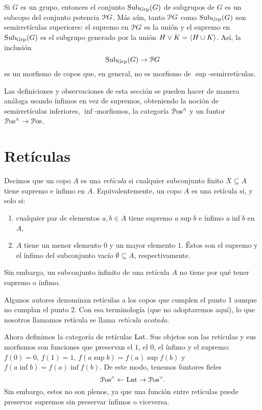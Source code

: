 \begin{example}
  Si $G$ es un grupo, entonces el conjunto $\Sub_\Grp(G)$ de subgrupos
  de $G$ es un subcopo del conjunto potencia $\cal PG$.
  Más aún, tanto $\cal PG$ como $\Sub_\Grp(G)$ son semirretículas
  superiores: el supremo en $\cal PG$ es la unión y el supremo en
  $\Sub_\Grp(G)$ es el subgrupo generado por la unión $H\sup K=\<H\cup
  K\>$. Así, la inclusión
  \begin{equation}
    \Sub_\Grp(G) \to \cal PG
  \end{equation}
  es un morfismo de copos que, en general, no es morfismo de
  $\sup$-semirretículas.
\end{example}

Las definiciones y observaciones de esta sección se pueden hacer
de manera análoga usando ínfimos en vez de supremos, obteniendo
la noción de semirretículas inferiores, $\inf$-morfismos, la
categoría $\Pos^{\inf}$ y un funtor $\Pos^{\inf}\to\Pos$.

\section{Retículas}\label{ret}

Decimos que un copo $A$ es una \emph{ retícula } si cualquier
subconjunto finito $X\subseteq A$ tiene supremo e ínfimo en $A$.
Equivalentemente, un copo $A$ es una retícula si, y solo si:
\begin{enumerate}
    \item
      cualquier par de elementos $a,b\in A$ tiene supremo $a\sup b$ e
      ínfimo $a\inf b$ en $A$,
    \item
      $A$ tiene un menor elemento $0$ y un mayor elemento $1$.
      Éstos son el supremo y el ínfimo del subconjunto vacío
      $\emptyset\subseteq A$, respectivamente.
\end{enumerate}
Sin embargo, un subconjunto infinito de una retícula $A$
no tiene por qué tener supremo o ínfimo.

Algunos autores denominan retículas a los copos que
cumplen el punto 1 aunque no cumplan el punto 2.
Con esa terminología (que no adoptaremos aquí), lo que nosotros
llamamos retícula se llama \emph{retícula acotada}.

Ahora definimos la categoría de retículas $\Lat$.
Sus objetos son las retículas y sus
morfismos son funciones que preservan el $1$, el $0$,
el ínfimo y el supremo: $f(0)=0$, $f(1)=1$,
$f(a\sup b)=f(a)\sup f(b)$ y $f(a\inf b)=f(a)\inf f(b)$.
De este modo, tenemos funtores fieles
\begin{equation}
  \Pos^{\inf}\from\Lat\to\Pos^{\sup}.
\end{equation}
Sin embargo, estos no son plenos, ya que una función entre retículas
puede preservar supremos sin preservar ínfimos o viceversa.

